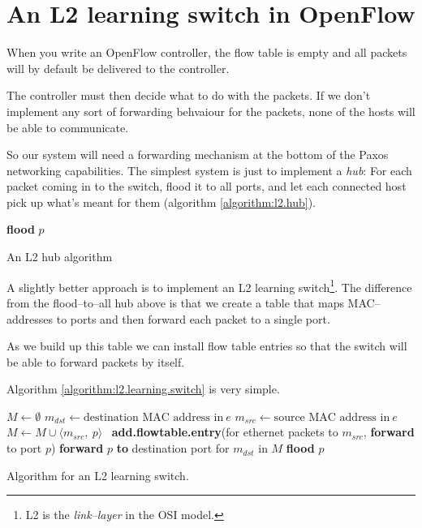 \section{An L2 learning switch in OpenFlow}

When you write an OpenFlow controller, the flow table is empty and all
packets will by default be delivered to the controller.

The controller must then decide what to do with the packets.  If we don't
implement any sort of forwarding behvaiour for the packets, none of the
hosts will be able to communicate.

So our system will need a forwarding mechanism at the bottom of the Paxos
networking capabilities.  The simplest system is just to implement a
\textit{hub}:  For each packet coming in to the switch, flood it to all
ports, and let each connected host pick up what's meant for them (algorithm
\ref{algorithm:l2.hub}).

\begin{algorithm}
  \begin{algorithmic}
      \State \textbf{flood} $p$ 
    \EndOn
  \end{algorithmic}
  \caption{An L2 hub algorithm}
  \label{algorithm:l2.hub}
\end{algorithm}

A slightly better approach is to implement an L2 learning switch\footnote{L2
is the \textit{link--layer} in the OSI model.}.  The difference from the
flood--to--all hub above is that we create a table that maps
MAC--addresses to ports and then forward each packet to a single port.

As we build up this table we can install flow table entries so that the
switch will be able to forward packets by itself.

Algorithm
\ref{algorithm:l2.learning.switch} is
very simple.

\begin{algorithm}
  \begin{algorithmic}
    \State $M \gets \emptyset$
    \State
      \State $m_{dst} \gets \text{destination MAC address in}\ e$
      \State $m_{src} \gets \text{source MAC address in}\ e$
      \State
      \State $M \gets M \cup \langle m_{src},\ p \rangle$ 
      \State
      \State \textbf{add.flowtable.entry}(for ethernet packets to
        $m_{src}$, \textbf{forward} to port $p$)
      \State
       
        \State \textbf{forward} $p$ \textbf{to} destination port for $m_{dst}$ in $M$
      \Else
        \State \textbf{flood} $p$ 
      \EndIf
    \EndOn
  \end{algorithmic}
  \caption{Algorithm for an L2 learning switch.}
  \label{algorithm:l2.learning.switch}
\end{algorithm}


